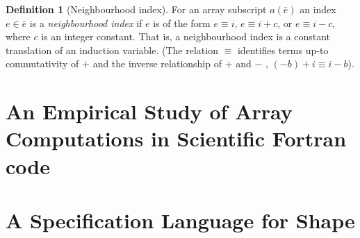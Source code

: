 \documentclass[acmlarge,review,anonymous]{acmart}\settopmatter{printfolios=true}
\theoremstyle{definition}
\newtheorem{defn}{Definition}
\theoremstyle{plain}
\theoremstyle{remark}
\begin{document}
\begin{defn}[Neighbourhood index]
\label{def:neighbour}
  For an array subscript $a(\bar{e})$ an index $e \in \bar{e}$ is a
  \emph{neighbourhood index} if $e$ is of the form $e \equiv i$, $e \equiv i +
  c$, or $e \equiv i - c$, where $c$ is an integer constant. That is, a
  neighbourhood index is a constant translation of an induction variable. (The
  relation $\equiv$ identifies terms up-to commutativity of $+$ and the inverse
  relationship of $+$ and $-$ \eg{}, $(-b) + i \equiv i - b$).
\end{defn}

\section{An Empirical Study of Array Computations in Scientific Fortran code}
\label{sec:study}


\section{A Specification Language for Shape}
\end{document}
